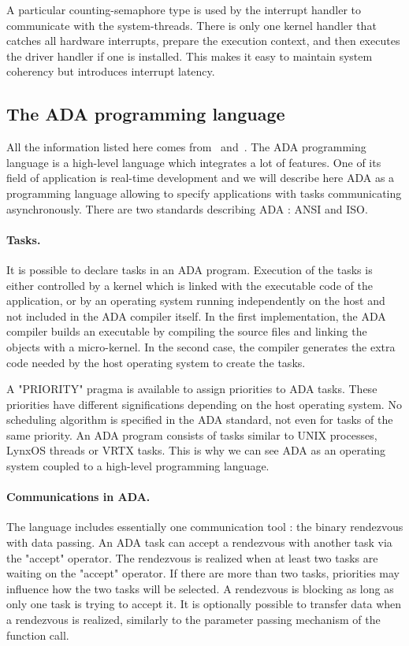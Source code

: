 \documentclass[10pt]{report}
\begin{document}
A particular counting-semaphore type is used by the interrupt handler to communicate with the system-threads. There is only one
kernel handler that catches all hardware interrupts, prepare the execution context, and then executes the driver handler if one is installed.
This makes it easy to maintain system coherency but introduces interrupt latency.

\subsection{The ADA programming language}

All the information listed here comes from~\cite{Booch:86} and~\cite{ADA:83}. The ADA programming language is a high-level language
which integrates a lot of features. One of its field of application is real-time development and we will describe here ADA
as a programming language allowing to specify applications with tasks communicating asynchronously. There are two standards
describing ADA : ANSI and ISO.

\paragraph{Tasks.} It is possible to declare tasks in an ADA program. Execution of the tasks is either controlled by a kernel which is 
linked with the executable code of the application, or by an operating system running independently on the host and not included in 
the ADA compiler itself. In the first implementation, the ADA compiler builds an executable by compiling the source files and linking the objects 
with a micro-kernel. In the second case, the compiler generates the extra code needed by the host operating system to create the tasks.

A "PRIORITY" pragma is available to assign priorities to ADA tasks. These priorities have different significations
depending on the host operating system. No scheduling algorithm is specified in the ADA standard, not even for tasks of the same priority. 
An ADA program consists of tasks similar to UNIX processes, LynxOS threads or VRTX tasks. This is why we can see ADA as an operating system 
coupled to a high-level programming language.

\paragraph{Communications in ADA.} The language includes essentially one communication tool : the binary rendezvous with data passing.
An ADA task can accept a rendezvous with another task via the "accept" operator. The rendezvous is realized when at least two
tasks are waiting on the "accept" operator. If there are more than two tasks, priorities may influence how the two tasks will be selected.
A rendezvous is blocking as long as only one task is trying to accept it. It is optionally possible to transfer data when a
rendezvous is realized, similarly to the parameter passing mechanism of the function call.
\end{document}

